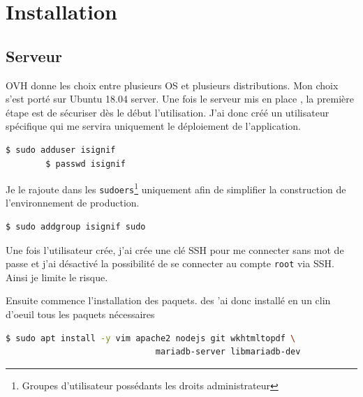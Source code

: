 \documentclass[]{report}
\begin{document}
  \section{Installation}

    \subsection{Serveur}

      OVH donne les choix entre plusieurs OS et plusieurs distributions. Mon choix s’est porté sur Ubuntu 18.04 server. Une fois le serveur mis en place , la première étape est de sécuriser dès le début l’utilisation. J’ai donc créé un utilisateur spécifique qui me servira uniquement le déploiement de l’application.

      \begin{scriptsize}
        \begin{lstlisting}[language=bash]
        $ sudo adduser isignif
        $ passwd isignif
        \end{lstlisting}
      \end{scriptsize}

      Je le rajoute dans les \verb|sudoers|\footnote{Groupes d’utilisateur possédants les droits administrateur} uniquement afin de simplifier la construction de l’environnement de production.

      \begin{scriptsize}
        \begin{lstlisting}[language=bash]
        $ sudo addgroup isignif sudo
        \end{lstlisting}
      \end{scriptsize}

      Une fois l’utilisateur crée, j’ai crée une clé SSH pour me connecter sans mot de passe et j’ai désactivé la possibilité de se connecter au compte \verb|root| via SSH. Ainsi je limite le risque.

      Ensuite commence l’installation des paquets. des ’ai donc installé en un clin d’oeuil tous les paquets nécessaires

      \begin{scriptsize}
        \begin{lstlisting}[language=bash]
        $ sudo apt install -y vim apache2 nodejs git wkhtmltopdf \
                              mariadb-server libmariadb-dev
        \end{lstlisting}
      \end{scriptsize}
\end{document}
